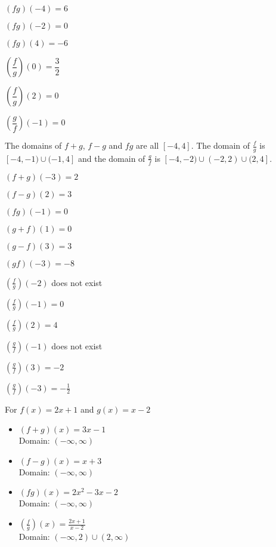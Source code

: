 \begin{exenum}
\item $(fg)(-4) = 6$ 
\item $(fg)(-2) = 0$
\item $(fg)(4) = -6$

\item $\left(\dfrac{f}{g}\right)(0) = \dfrac{3}{2}$
\item $\left(\dfrac{f}{g}\right)(2) =  0$
\item $\left(\dfrac{g}{f}\right)(-1) = 0$ 

\item The domains of $f+g$, $f-g$ and $fg$ are all $[-4,4]$.  The domain of $\frac{f}{g}$ is $[-4, -1) \cup (-1,4]$ and the domain of $\frac{g}{f}$ is $[-4, -2) \cup (-2,2) \cup (2, 4]$.

\item $(f + g)(-3) = 2$
\item $(f - g)(2) = 3$
\item $(fg)(-1) = 0$

\item $(g + f)(1) = 0$
\item $(g - f)(3) = 3$
\item $(gf)(-3) = -8$

\item $\left(\frac{f}{g}\right)(-2)$ does not exist
\item $\left(\frac{f}{g}\right)(-1) = 0$
\item $\left(\frac{f}{g}\right)(2) = 4$
\item $\left(\frac{g}{f}\right)(-1)$ does not exist
\item $\left(\frac{g}{f}\right)(3) = -2$ 
\item $\left(\frac{g}{f}\right)(-3) = -\frac{1}{2}$ 

\item For $f(x) = 2x+1$ and $g(x) = x-2$

\begin{itemize}
\item $(f+g)(x) = 3x-1$ \\
      Domain: $(-\infty, \infty)$
\item $(f-g)(x) = x+3$ \\
      Domain:  $(-\infty, \infty)$
\item $(fg)(x) = 2x^2-3x-2$ \\
      Domain: $(-\infty, \infty)$
\item $\left(\frac{f}{g}\right)(x) = \frac{2x+1}{x-2}$ \\
      Domain:  $(-\infty, 2) \cup (2, \infty)$
\end{itemize}


\end{exenum}
